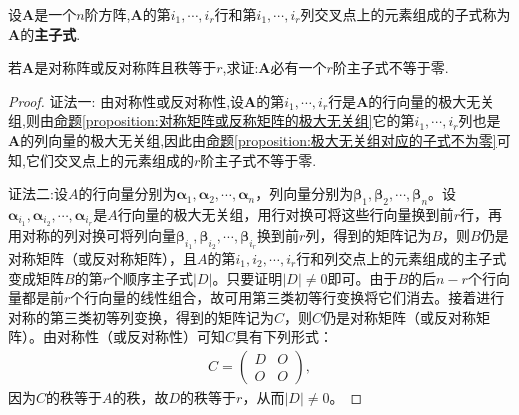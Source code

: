 \documentclass[../../main.tex]{subfiles}%
\begin{document}
\begin{definition}[主子式]
设\(\boldsymbol{A}\)是一个\(n\)阶方阵,\(\boldsymbol{A}\)的第\(i_1,\cdots,i_r\)行和第\(i_1,\cdots,i_r\)列交叉点上的元素组成的子式称为\(\boldsymbol{A}\)的\textbf{主子式}. 
\end{definition}

\begin{proposition}\label{proposition:对称阵或反对称阵必有非零主子式}
若\(\boldsymbol{A}\)是对称阵或反对称阵且秩等于\(r\),求证:\(\boldsymbol{A}\)必有一个\(r\)阶主子式不等于零.
\end{proposition}
\begin{proof}

{\color{blue}证法一:}
由对称性或反对称性,设\(\boldsymbol{A}\)的第\(i_1,\cdots,i_r\)行是\(\boldsymbol{A}\)的行向量的极大无关组,则由\hyperref[proposition:对称矩阵或反称矩阵的极大无关组]{命题\ref{proposition:对称矩阵或反称矩阵的极大无关组}}它的第\(i_1,\cdots,i_r\)列也是\(\boldsymbol{A}\)的列向量的极大无关组,因此由\hyperref[proposition:极大无关组对应的子式不为零]{命题\ref{proposition:极大无关组对应的子式不为零}}可知,它们交叉点上的元素组成的\(r\)阶主子式不等于零. 

{\color{blue}证法二:}设\(A\)的行向量分别为\(\boldsymbol{\alpha}_1,\boldsymbol{\alpha}_2,\cdots,\boldsymbol{\alpha}_n\)，列向量分别为\(\boldsymbol{\beta}_1,\boldsymbol{\beta}_2,\cdots,\boldsymbol{\beta}_n\)。设\(\boldsymbol{\alpha}_{i_1},\boldsymbol{\alpha}_{i_2},\cdots,\boldsymbol{\alpha}_{i_r}\)是\(A\)行向量的极大无关组，用行对换可将这些行向量换到前\(r\)行，再用对称的列对换可将列向量\(\boldsymbol{\beta}_{i_1},\boldsymbol{\beta}_{i_2},\cdots,\boldsymbol{\beta}_{i_r}\)换到前\(r\)列，得到的矩阵记为\(B\)，则\(B\)仍是对称矩阵（或反对称矩阵），且\(A\)的第\(i_1,i_2,\cdots,i_r\)行和列交点上的元素组成的主子式变成矩阵\(B\)的第\(r\)个顺序主子式\(\vert D\vert\)。只要证明\(\vert D\vert\neq 0\)即可。由于\(B\)的后\(n - r\)个行向量都是前\(r\)个行向量的线性组合，故可用第三类初等行变换将它们消去。接着进行对称的第三类初等列变换，得到的矩阵记为\(C\)，则\(C\)仍是对称矩阵（或反对称矩阵）。由对称性（或反对称性）可知\(C\)具有下列形式：
\begin{align*}
C = \begin{pmatrix}
D & O \\
O & O
\end{pmatrix},
\end{align*}
因为\(C\)的秩等于\(A\)的秩，故\(D\)的秩等于\(r\)，从而\(\vert D\vert\neq 0\)。 \end{proof}
\end{document}
